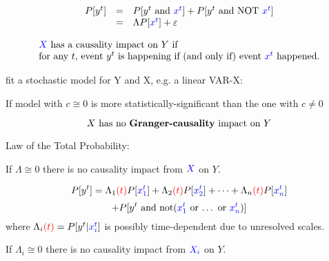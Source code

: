 \documentclass{article}
\begin{document}
\begin{displaymath}
 \begin{array}{rcl}
  P[y^t] & = & P[y^t ~\textrm{and}~ {\color{blue} x^t}] + P[y^t ~\textrm{and NOT} ~ {\color{blue} x^t}] \\
  & = & \Lambda P[{\color{blue} x^t}] + \varepsilon
 \end{array}
\end{displaymath}

\begin{displaymath}
\begin{array}{l}
\textrm{${\color{blue} X}$ has a causality impact on $Y$ if} \\
\textrm{for any $t$, event $y^t$ is happening if (and only if) event ${\color{blue} x^t}$ happened.}
\end{array}
\end{displaymath}

fit a stochastic model for Y and X, e.g. a linear VAR-X: \newline

If model with $c \cong 0$ is more statistically-significant than the one with $c \neq 0$

\begin{displaymath}
\textrm{$X$ has no \textbf{Granger-causality} impact on $Y$}
\end{displaymath}

Law of  the Total Probability: \newline

If $\Lambda \cong 0$ there is no causality impact from ${\color{blue} X}$ on $Y$. 

\begin{displaymath}
P[y^t] = 
\Lambda_1 {\color{red} (t)} P [{\color{blue} x_1^t}]
+
\Lambda_2 {\color{red} (t)} P [{\color{blue} x_2^t}]
+
\dots
+
\Lambda_n {\color{red} (t)} P [{\color{blue} x_n^t}]
\end{displaymath}
\begin{displaymath}
+ P[y^t ~\textrm{and not$({\color{blue} x_1^t}$ or $\dots$ or ${\color{blue} x_n^t})$} ]
\end{displaymath}
where $\Lambda_i {\color{red} (t)} = P [y^t \vert {\color{blue} x_i^t}]$ is possibly time-dependent due to unresolved scales. \newline

If $\Lambda_i \cong 0$ there is no causality impact from ${\color{blue} X_i}$ on $Y$. 
\end{document}
